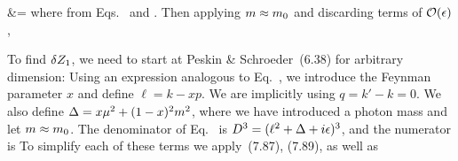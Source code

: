 {{		&=  \intoq \ddx {}
	}
	where
	from Eqs.~ and .  Then applying $m \approx m_0$ and discarding terms of $\order{\eps}$,
	
	To find $\delta Z_1$, we need to start at Peskin \& Schroeder~(6.38) for arbitrary dimension:
	Using an expression analogous to Eq.~, we introduce the Feynman parameter $x$ and define $\ell = k - x p$.  We are implicitly using $q = k' - k = 0$.  We also define $\Delta = x \mu^2 + (1 - x)^2 m^2$, where we have introduced a photon mass and let $m \approx m_0$.  The denominator of Eq.~ is $D^3 = (\ell^2 + \Delta + i \epsilon)^3$, and the numerator is
	To simplify each of these terms we apply~(7.87),
	(7.89),
	as well as~\cite[pp.~191--192]{Peskin}
}
